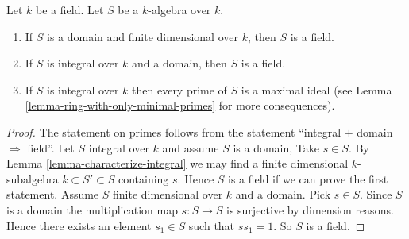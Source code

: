 \begin{lemma}
\label{lemma-integral-over-field}
Let $k$ be a field. Let $S$ be a $k$-algebra over $k$.
\begin{enumerate}
\item If $S$ is a domain and finite dimensional over $k$,
then $S$ is a field.
\item If $S$ is integral over $k$ and a domain,
then $S$ is a field.
\item If $S$ is integral over $k$ then every prime of
$S$ is a maximal ideal (see
Lemma \ref{lemma-ring-with-only-minimal-primes}
for more consequences).
\end{enumerate}
\end{lemma}

\begin{proof}
The statement on primes follows from the statement
``integral $+$ domain $\Rightarrow$ field''.
Let $S$ integral over $k$ and assume $S$ is a domain,
Take $s \in S$. By Lemma
\ref{lemma-characterize-integral} we may find a
finite dimensional $k$-subalgebra $k \subset S' \subset S$
containing $s$. Hence $S$ is a field if we can prove the
first statement. Assume $S$ finite dimensional
over $k$ and a domain. Pick $s\in S$.
Since $S$ is a domain the multiplication
map $s : S \to S$ is surjective by dimension
reasons. Hence there exists an element $s_1 \in S$
such that $ss_1 = 1$. So $S$ is a field.
\end{proof}